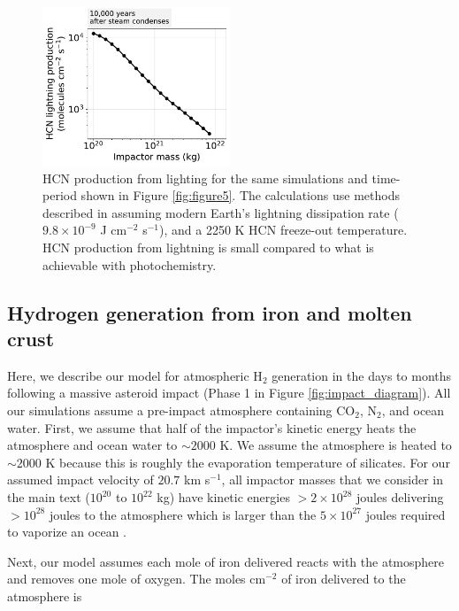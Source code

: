 \begin{figure}
  \centering
  \includegraphics[width=0.5\textwidth]{tex/5impacts/figures/supplement/Figure5_lightning.pdf}
  \caption{HCN production from lighting for the same simulations and time-period shown in Figure \ref{fig:figure5}. The calculations use methods described in \citet{Chameides_1981} assuming modern Earth's lightning dissipation rate ($9.8 \times 10^{-9}$ J cm$^{-2}$ s$^{-1}$), and a 2250 K HCN freeze-out temperature. HCN production from lightning is small compared to what is achievable with photochemistry.}
  \label{fig:figure5_lightning}
\end{figure}

\subsection{Hydrogen generation from iron and molten crust} \label{sec:phase1_appendix}

Here, we describe our model for atmospheric H$_2$ generation in the days to months following a massive asteroid impact (Phase 1 in Figure \ref{fig:impact_diagram}). All our simulations assume a pre-impact atmosphere containing CO$_2$, N$_2$, and ocean water. First, we assume that half of the impactor's kinetic energy heats the atmosphere and ocean water to $\sim 2000$ K. We assume the atmosphere is heated to $\sim 2000$ K because this is roughly the evaporation temperature of silicates. For our assumed impact velocity of $20.7$ km s$^{-1}$, all impactor masses that we consider in the main text ($10^{20}$ to $10^{22}$ kg) have kinetic energies $> 2 \times 10^{28}$ joules delivering $> 10^{28}$ joules to the atmosphere which is larger than the $5 \times 10^{27}$ joules required to vaporize an ocean \citep{Sleep_1989}. 

Next, our model assumes each mole of iron delivered reacts with the atmosphere and removes one mole of oxygen. The moles cm$^{-2}$ of iron delivered to the atmosphere is

